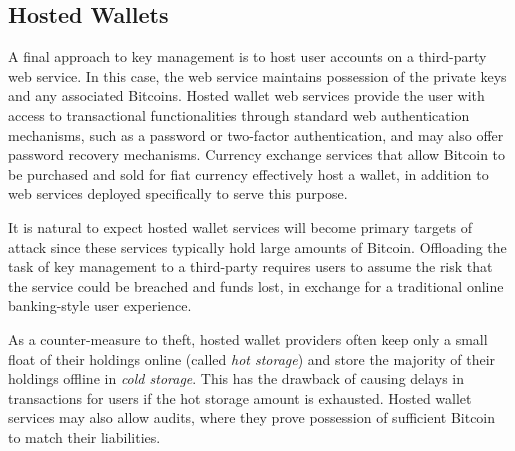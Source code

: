 \subsection{Hosted Wallets} 
A final approach to key management is to host user accounts on a third-party web service. In this case, the web service maintains possession of the private keys and any associated Bitcoins. Hosted wallet web services provide the user with access to transactional functionalities through standard web authentication mechanisms, such as a password or two-factor authentication, and may also offer password recovery mechanisms. Currency exchange services that allow Bitcoin to be purchased and sold for fiat currency effectively host a wallet, in addition to web services deployed specifically to serve this purpose.


It is natural to expect hosted wallet services will become primary targets of attack since these services typically hold large amounts of Bitcoin. Offloading the task of key management to a third-party requires users to assume the risk that the service could be breached and funds lost, in exchange for a traditional online banking-style user experience. 

As a counter-measure to theft, hosted wallet providers often keep only a small float of their holdings online (called \textit{hot storage}) and store the majority of their holdings offline in \textit{cold storage}. This has the drawback of causing delays in transactions for users if the hot storage amount is exhausted.
Hosted wallet services may also allow audits, where they prove possession of sufficient Bitcoin to match their liabilities.  

